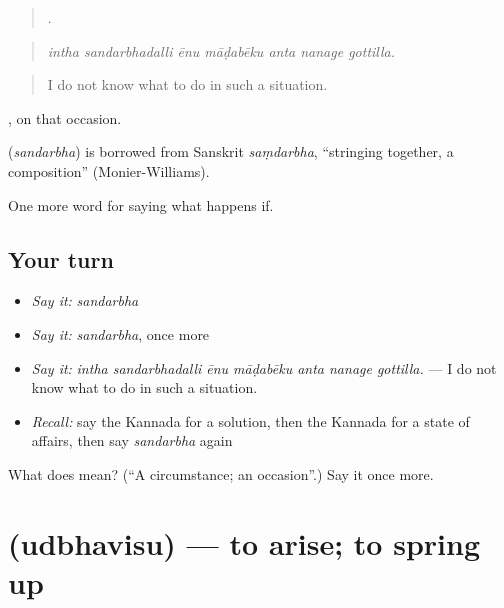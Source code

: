 \begin{quote}
      .
\end{quote}

\begin{quote}
\emph{intha sandarbhadalli ēnu māḍabēku anta nanage gottilla.}
\end{quote}

\begin{quote}
I do not know what to do in such a situation.
\end{quote}

 , on that occasion.

\begin{cousinweb}
\textbf{} (\emph{sandarbha}) is borrowed from Sanskrit \emph{saṃdarbha}, \textquotedblleft{}stringing together, a composition\textquotedblright{} (Monier-Williams).
\end{cousinweb}

\begin{grammarlens}[title={What you've built}]
One more word for saying what happens if.
\end{grammarlens}

\subsection*{Your turn}
\begin{itemize}
\raggedright
  \item \emph{Say it:} \emph{sandarbha}
  \item \emph{Say it:} \emph{sandarbha}, once more
  \item \emph{Say it:} \emph{intha sandarbhadalli ēnu māḍabēku anta nanage gottilla.} — I do not know what to do in such a situation.
  \item \emph{Recall:} say the Kannada for a solution, then the Kannada for a state of affairs, then say \emph{sandarbha} again
\end{itemize}

\begin{tcolorbox}[breakable,colback=teal!4,colframe=teal!35!black,title={Before you move on}]
What does  mean? (\textquotedblleft{}A circumstance; an occasion\textquotedblright{}.) Say it once more.
\end{tcolorbox}
\section[\texorpdfstring{\kn{ಉದ್ಭವಿಸು} (udbhavisu)}{ಉದ್ಭವಿಸು (udbhavisu)}]{ (udbhavisu) — to arise; to spring up}

